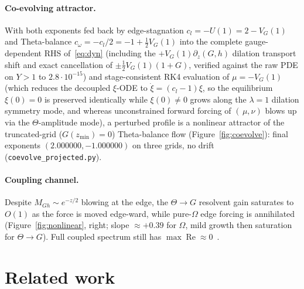 \documentclass[11pt,a4paper]{article}
\begin{document}
\paragraph{Co-evolving attractor.}
With both exponents fed back by edge-stagnation $c_l=-U(1)=2-V_G(1)$ and Theta-balance
$c_\omega=-c_l/2=-1+\tfrac12 V_G(1)$ into the complete gauge-dependent RHS of~\eqref{eq:dyn}
(including the $+V_G(1)\partial_z(G,h)$ dilation transport shift and exact cancellation of
$\pm\tfrac12 V_G(1)(1+G)$, verified against the raw PDE on $Y>1$ to $2.8\cdot 10^{-15}$)
and stage-consistent RK4 evaluation of $\mu=-V_G(1)$ (which reduces the decoupled $\xi$-ODE to
$\dot\xi=(c_l-1)\xi$, so the equilibrium $\xi(0)=0$ is preserved identically while $\xi(0)\ne 0$
grows along the $\lambda=1$ dilation symmetry mode, and whereas unconstrained forward forcing of
$(\,\mu,\nu)$ blows up via the $\Theta$-amplitude mode), a perturbed profile is a nonlinear
attractor of the truncated-grid ($G(z_{\min})=0$) Theta-balance flow (Figure~\ref{fig:coevolve}):
final exponents $(2.000000,-1.000000)$ on three grids, no drift
(\texttt{coevolve\_projected.py}).

\paragraph{Coupling channel.}
Despite $M_{Gh}\sim e^{-z/2}$ blowing at the edge, the $\Theta\to G$ resolvent gain
saturates to $O(1)$ as the force is moved edge-ward, while pure-$\Omega$ edge forcing
is annihilated (Figure~\ref{fig:nonlinear}, right; slope $\approx +0.39$ for $\Omega$,
mild growth then saturation for $\Theta\to G$).  Full coupled spectrum still has
$\max\operatorname{Re}\approx 0$~\cite{findings_coupled}.

\section{Related work}
\end{document}
